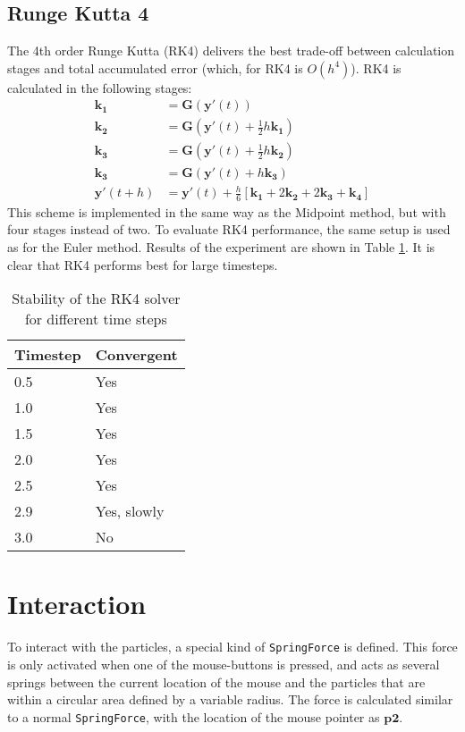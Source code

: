 \documentclass[a4paper,twoside,11pt,twocolumn]{article}
\begin{document}
\subsection{Runge Kutta 4}
The 4th order Runge Kutta (RK4) delivers the best trade-off between calculation stages and total accumulated error (which, for RK4 is $O(h^4)$). RK4 is calculated in the following stages:
\begin{align}
	\mathbf{k_1} &= \mathbf{G}(\mathbf{y}'(t))\\
	\mathbf{k_2} &= \mathbf{G}(\mathbf{y}'(t)+\frac{1}{2}h\mathbf{k_1})\\
	\mathbf{k_3} &= \mathbf{G}(\mathbf{y}'(t)+\frac{1}{2}h\mathbf{k_2})\\
	\mathbf{k_3} &= \mathbf{G}(\mathbf{y}'(t)+h\mathbf{k_3})\\
	\mathbf{y}'(t+h) &= \mathbf{y}'(t) + \frac{h}{6}[\mathbf{k_1}+2\mathbf{k_2}+2\mathbf{k_3}+\mathbf{k_4}]
\end{align}
This scheme is implemented in the same way as the Midpoint method, but with four stages instead of two.
To evaluate RK4 performance, the same setup is used as for the Euler method. Results of the experiment are shown in Table \ref{RK4}. It is clear that RK4 performs best for large timesteps.
\begin{table}[h]
	\caption{Stability of the RK4 solver for different time steps}
	\label{RK4}
	\begin{tabular}{|l|l|}
		\hline
		\textbf{Timestep} & \textbf{Convergent} \\ \hline
		0.5               & Yes                 \\ \hline
		1.0               & Yes                 \\ \hline
		1.5               & Yes                 \\ \hline
		2.0               & Yes                 \\ \hline
		2.5               & Yes                 \\ \hline
		2.9               & Yes, slowly         \\ \hline
		3.0               & No                  \\ \hline
	\end{tabular}
\end{table}

\section{Interaction}
To interact with the particles, a special kind of \texttt{SpringForce} is defined. This force is only activated when one of the mouse-buttons is pressed, and acts as several springs between the current location of the mouse and the particles that are within a circular area defined by a variable radius. The force is calculated similar to a normal \texttt{SpringForce}, with the location of the mouse pointer as $\mathbf{p2}$.
\end{document}
